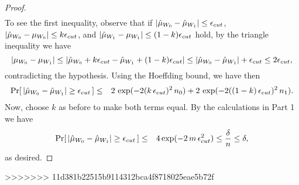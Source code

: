 \begin{proof}
\begin{eqnarray*}
\end{eqnarray*}
%
To see the first inequality, observe that if $|\hat{\mu}_{W_0} - \hat{\mu}_{W_1}| \le  \epsilon_{cut}$, 
$|\hat{\mu}_{W_0} - {\mu}_{W_0}| \le  k \epsilon_{cut}$, 
and $|\hat{\mu}_{W_1} - {\mu}_{W_1}| \le  (1-k) \epsilon_{cut}$
hold, by the triangle inequality we have 
$$
|{\mu}_{W_0} - {\mu}_{W_1}| \le |\hat{\mu}_{W_0} + k\epsilon_{cut} - \hat{\mu}_{W_1} + (1-k)\epsilon_{cut}| 
\le |\hat{\mu}_{W_0}-\hat{\mu}_{W_1}| + \epsilon_{cut} \le 2\epsilon_{cut},$$
contradicting the hypothesis. 
Using the Hoeffding bound, we have then 
%
\begin{eqnarray*}
\Pr [\, |\hat{\mu}_{W_0} - \hat{\mu}_{W_1}| \ge  \epsilon_{cut} \,]   &\le&
2 \, \exp(-2(k\,\epsilon_{cut})^2 \, n_0) + 2 \, \exp(-2((1-k)\,\epsilon_{cut})^2 \, n_1). 
\end{eqnarray*} 
%
Now, choose $k$ as before to make both terms equal. By the calculations
in Part 1 we have 
%
\begin{eqnarray*}
\Pr [\, |\hat{\mu}_{W_0} - \hat{\mu}_{W_1}| \ge  \epsilon_{cut} \,]  &\le& 
4 \exp(-2 \, m \, \epsilon_{cut}^2) \le \frac{\delta}{n} \le \delta,
\end{eqnarray*} 
%
as desired. 

\end{proof}
>>>>>>> 11d381b22515b9114312bca4f8718025eae5b72f
